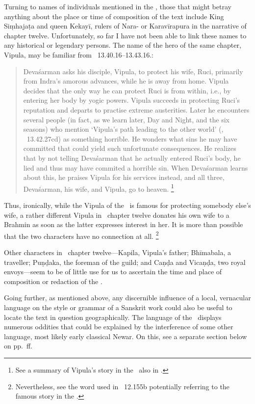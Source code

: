 Turning to names of individuals mentioned in the \VSS,
those that might betray anything about the place or
time of composition of the text include King Siṃhajaṭa
and queen Kekayī, rulers of Nara- or Karavīrapura
in the narrative of chapter twelve. Unfortunately,
so far I have not been able to link these names to
any historical or legendary persons. The name of the
hero of the same chapter, Vipula,\label{Vipula} may be familiar 
from \MBH\ 13.40.16--13.43.16.: 

\begin{quote}
Devaśarman asks his disciple,
Vipula, to protect his wife, Ruci, primarily from Indra's
amorous advances, while he is away from home.
Vipula decides that the only way he can protect Ruci
is from within, i.e., by entering her body by yogic powers.
Vipula succeeds in protecting Ruci's reputation and 
departs to practise extreme austerities. Later he 
encounters several people (in fact,
as we learn later, Day and Night,
and the six seasons) who mention `Vipula's path leading to
the other world' (, 
\MBH\ 13.42.27cd) as something horrible. He 
wonders what sins he may have committed that
could yield such unfortunate consequences. He
realizes that by not telling Devaśarman that he
actually entered Ruci's body, he lied and thus
may have commited a horrible sin. When Devaśarman learns
about this, he praises Vipula for his services instead, 
and all three, Devaśarman, his wife, and Vipula,
go to heaven.%
		\footnote{See a summary of Vipula's story in the 
			\MBH\ also in 
			.}
\end{quote}

\noindent
Thus, ironically, while the Vipula of the \MBH\ is famous
for protecting somebody else's wife,  
a rather different Vipula
in \VSS\ chapter twelve donates
his own wife to a Brahmin as soon as the latter expresses
interest in her. It is more than possible that
the two characters have no connection at all.%
	\footnote{Nevertheless, see the word  used
	in \VSS\ 12.155b potentially referring to the famous
	story in the \MBh.}

Other characters in \VSS\ chapter twelve---Kapila, 
Vipula's father;
Bhīmabala, a traveller; Puṇḍaka, the foreman of the guild;
and Caṇḍa and Vicaṇḍa, two royal envoys---seem 
to be of little use for us to ascertain the time and place of composition or redaction of the \VSS. 

Going further, as mentioned above, any discernible influence
of a local, vernacular language on the style or grammar of
a Sanskrit work could also be useful to
locate the text in question geographically. 
The language of the \VSS\
displays numerous oddities that could be
explained by the interference of some other 
language, most likely early classical Newar.
On this, see a separate section below on 
pp.~\pageref{newar}ff.

